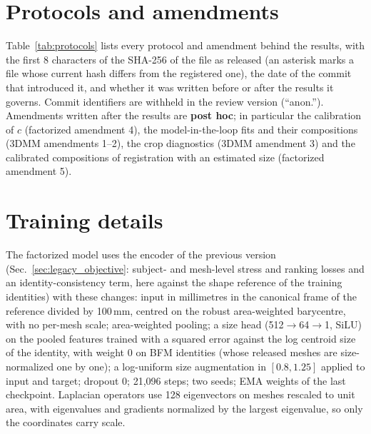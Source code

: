 \documentclass[10pt,twocolumn,letterpaper]{article}
\begin{document}
\FloatBarrier
\section{Protocols and amendments}
\label{sec:protocols}
Table~\ref{tab:protocols} lists every protocol and amendment behind the results, with the first 8 characters of the SHA-256 of the file as released (an asterisk marks a file whose current hash differs from the registered one), the date of the commit that introduced it, and whether it was written before or after the results it governs. Commit identifiers are withheld in the review version (``anon.''). Amendments written after the results are \textbf{post hoc}; in particular the calibration of $c$ (factorized amendment 4), the model-in-the-loop fits and their compositions (3DMM amendments 1--2), the crop diagnostics (3DMM amendment 3) and the calibrated compositions of registration with an estimated size (factorized amendment 5).

\begin{table}[t]
  \centering
  \scriptsize
  \caption{Protocols and amendments (generated from the repository; \texttt{make\_tables.py}).}
  \label{tab:protocols}
  
\end{table}

\FloatBarrier
\section{Training details}
\label{sec:training}
The factorized model uses the encoder of the previous version (Sec.~\ref{sec:legacy_objective}: subject- and mesh-level stress and ranking losses and an identity-consistency term, here against the shape reference of the training identities) with these changes: input in millimetres in the canonical frame of the reference divided by 100\,mm, centred on the robust area-weighted barycentre, with no per-mesh scale; area-weighted pooling; a size head (512$\to$64$\to$1, SiLU) on the pooled features trained with a squared error against the log centroid size of the identity, with weight 0 on BFM identities (whose released meshes are size-normalized one by one); a log-uniform size augmentation in $[0.8, 1.25]$ applied to input and target; dropout 0; 21{,}096 steps; two seeds; EMA weights of the last checkpoint. Laplacian operators use 128 eigenvectors on meshes rescaled to unit area, with eigenvalues and gradients normalized by the largest eigenvalue, so only the coordinates carry scale.
\end{document}
